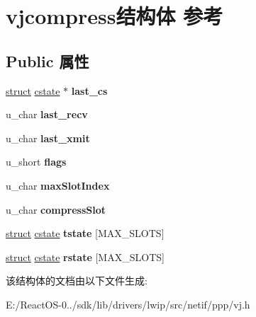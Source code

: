 \hypertarget{structvjcompress}{}\section{vjcompress结构体 参考}
\label{structvjcompress}
\subsection*{Public 属性}
\begin{DoxyCompactItemize}
\item 
\mbox{\label{structvjcompress_a08bed63287a39565d52add83f7886700}} 
\hyperlink{interfacestruct}{struct} \hyperlink{structcstate}{cstate} $\ast$ {\bfseries last\+\_\+cs}
\item 
\mbox{\label{structvjcompress_af081237c1c60adf1ef71f0ab46c73bfc}} 
u\+\_\+char {\bfseries last\+\_\+recv}
\item 
\mbox{\label{structvjcompress_a64af46453a440f3f4c058b7168afcc8c}} 
u\+\_\+char {\bfseries last\+\_\+xmit}
\item 
\mbox{\label{structvjcompress_a6dac78979fd7e4eecd130b98e6eaa49d}} 
u\+\_\+short {\bfseries flags}
\item 
\mbox{\label{structvjcompress_a62f5f3680edaceb76f477360e5c10db5}} 
u\+\_\+char {\bfseries max\+Slot\+Index}
\item 
\mbox{\label{structvjcompress_aae3de98b583dba377799773555673a26}} 
u\+\_\+char {\bfseries compress\+Slot}
\item 
\mbox{\label{structvjcompress_aa97f58eba5b76d8123b6c2cab868a4dc}} 
\hyperlink{interfacestruct}{struct} \hyperlink{structcstate}{cstate} {\bfseries tstate} \mbox{[}M\+A\+X\+\_\+\+S\+L\+O\+TS\mbox{]}
\item 
\mbox{\label{structvjcompress_a67c62125a344bb0288aa19c0c3e2925f}} 
\hyperlink{interfacestruct}{struct} \hyperlink{structcstate}{cstate} {\bfseries rstate} \mbox{[}M\+A\+X\+\_\+\+S\+L\+O\+TS\mbox{]}
\end{DoxyCompactItemize}


该结构体的文档由以下文件生成\+:\begin{DoxyCompactItemize}
\item 
E\+:/\+React\+O\+S-\/0../sdk/lib/drivers/lwip/src/netif/ppp/vj.\+h\end{DoxyCompactItemize}
